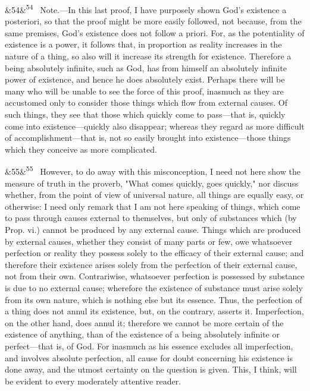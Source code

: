 \documentclass[12pt]{article}
\newcommand{\para}[1][]{\par\noindent\ifx&#1&\else\textsuperscript{\footnotesize #1}~\fi}
\begin{document}
\para[54] Note.---In this last proof, I have purposely shown God's existence a posteriori, so that the proof might be more easily followed, not because, from the same premises, God's existence does not follow a priori. For, as the potentiality of existence is a power, it follows that, in proportion as reality increases in the nature of a thing, so also will it increase its strength for existence. Therefore a being absolutely infinite, such as God, has from himself an absolutely infinite power of existence, and hence he does absolutely exist. Perhaps there will be many who will be unable to see the force of this proof, inasmuch as they are accustomed only to consider those things which flow from external causes. Of such things, they see that those which quickly come to pass---that is, quickly come into existence---quickly also disappear; whereas they regard as more difficult of accomplishment---that is, not so easily brought into existence---those things which they conceive as more complicated.

\para[55] However, to do away with this misconception, I need not here show the measure of truth in the proverb, "What comes quickly, goes quickly," nor discuss whether, from the point of view of universal nature, all things are equally easy, or otherwise: I need only remark that I am not here speaking of things, which come to pass through causes external to themselves, but only of substances which (by Prop. vi.) cannot be produced by any external cause. Things which are produced by external causes, whether they consist of many parts or few, owe whatsoever perfection or reality they possess solely to the efficacy of their external cause; and therefore their existence arises solely from the perfection of their external cause, not from their own. Contrariwise, whatsoever perfection is possessed by substance is due to no external cause; wherefore the existence of substance must arise solely from its own nature, which is nothing else but its essence. Thus, the perfection of a thing does not annul its existence, but, on the contrary, asserts it. Imperfection, on the other hand, does annul it; therefore we cannot be more certain of the existence of anything, than of the existence of a being absolutely infinite or perfect---that is, of God. For inasmuch as his essence excludes all imperfection, and involves absolute perfection, all cause for doubt concerning his existence is done away, and the utmost certainty on the question is given. This, I think, will be evident to every moderately attentive reader.
\end{document}
